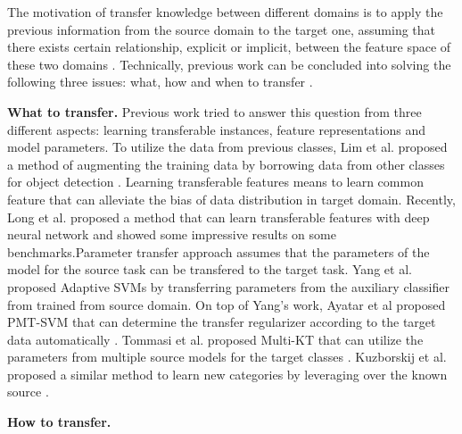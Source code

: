 The motivation of transfer knowledge between different domains is to apply the previous information from the source domain to the target one, assuming that there exists certain relationship, explicit or implicit, between the  feature space of these two domains \cite{pan2010survey}. Technically, previous work can be concluded into solving the following three issues: what, how and when to transfer \cite{tommasi2014learning}.


\textbf{What to transfer.} Previous work tried to answer this question from three different aspects: learning transferable instances, feature representations and model parameters. To utilize the data from previous classes, Lim et al. proposed a method of augmenting the training data by borrowing data from other classes for object detection \cite{lim2012transfer}. Learning transferable features means to learn common feature that can alleviate the bias of data distribution in target domain. Recently, Long et al. proposed a method that can learn transferable features with deep neural network  and showed some impressive results on some  benchmarks\cite{LongICML15}.Parameter transfer
approach assumes that the parameters of the model for the source task can be transfered to the target task. Yang et al. proposed Adaptive SVMs by transferring parameters from the auxiliary classifier from trained from source domain\cite{yang2007cross}. On top of Yang's work, Ayatar et al proposed PMT-SVM that can determine the transfer regularizer according to the target data automatically \cite{aytar2011tabula}. Tommasi et al. proposed Multi-KT that can utilize the parameters from multiple source models for the target classes  \cite{tommasi2014learning}.
Kuzborskij et al. proposed a similar method to learn new categories by leveraging over the known source \cite{kuzborskij2013n}.

\textbf{How to transfer.}
